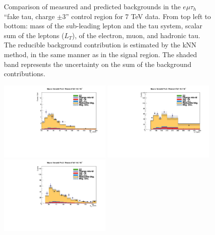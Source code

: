 \begin{figure}
\begin{center}
  \caption{Comparison of measured and predicted backgrounds in the $e\mu\tau_h$ ``fake tau, charge $\pm3$'' control region for 7 TeV data.
  From top left to bottom: mass of the sub-leading lepton and the tau system, scalar sum of the leptons \pT ($L_T$), \pT of the electron, muon, and hadronic tau.
  The reducible background contribution is estimated by the kNN method, in the same manner as in the signal region.
  The shaded band represents the uncertainty on the sum of the background contributions.
  }
  \label{fig:LLT_emt_f3_charge3_control_7TeV}
\end{center}
\end{figure}

\begin{figure}
\begin{center}
  \includegraphics[width=0.49\textwidth]{4_Analisys/pics/8TeV/plots/emt/f3/Full_charge3/final-f3-subMass-Full.pdf}
  \includegraphics[width=0.49\textwidth]{4_Analisys/pics/8TeV/plots/emt/f3/final-f3-LT-charge3.pdf}\\
  \includegraphics[width=0.49\textwidth]{4_Analisys/pics/8TeV/plots/emt/f3/Full_charge3/final-f3-ePt-Full.pdf}

\end{center}
\end{figure}
